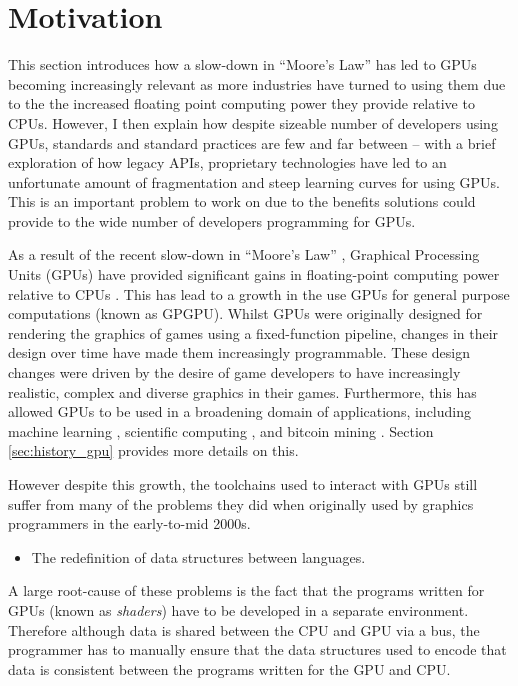 \documentclass[a4paper,12pt,twoside,openright]{report}
\begin{document}
\section{Motivation}

This section introduces how a slow-down in ``Moore's Law'' has led to GPUs
becoming increasingly relevant as more industries have turned to using them due
to the the increased floating point computing power they provide relative to
CPUs. However, I then explain how despite sizeable number of developers using
GPUs, standards and standard practices are few and far between -- with a brief
exploration of how legacy APIs, proprietary technologies have led to an
unfortunate amount of fragmentation and steep learning curves for using GPUs.
This is an important problem to work on due to the benefits solutions could
provide to the wide number of developers programming for GPUs.

As a result of the recent slow-down in ``Moore's Law'' \cite{MooreLawSlowdown},
Graphical Processing Units (GPUs) have provided significant gains in
floating-point computing power relative to CPUs \cite{CPUGPUOverTime}. This has
lead to a growth in the use GPUs for general purpose computations (known as
GPGPU). Whilst GPUs were originally designed for rendering the graphics of
games using a fixed-function pipeline, changes in their design over time have
made them increasingly programmable. These design changes were driven by the
desire of game developers to have increasingly realistic, complex and diverse
graphics in their games. Furthermore, this has allowed GPUs to be used in a
broadening domain of applications, including machine learning \cite{TODO},
scientific computing \cite{TODO}, and bitcoin mining \cite{TODO}. Section
\ref{sec:history_gpu} provides more details on this.

However despite this growth, the toolchains used to interact with GPUs still
suffer from many of the problems they did when originally used by graphics
programmers in the early-to-mid 2000s.

\begin{itemize}

    \item The redefinition of data structures between languages.

\end{itemize}

A large root-cause of these problems is the fact that the programs written for
GPUs (known as \textit{shaders}) have to be developed in a separate
environment. Therefore although data is shared between the CPU and GPU via a
bus, the programmer has to manually ensure that the data structures used to
encode that data is consistent between the programs written for the GPU and
CPU.
\end{document}
